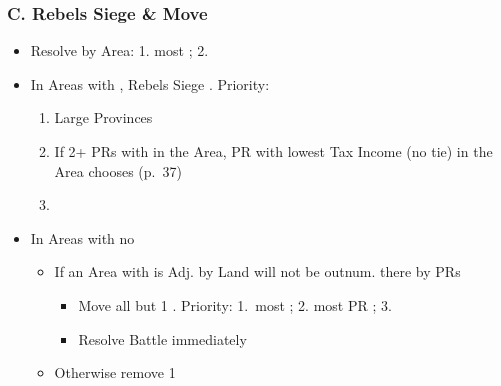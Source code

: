 \documentclass[10pt]{article}
\begin{document}
\subsubsection*{C. Rebels Siege \& Move}
\begin{itemize}
	\item Resolve by Area: 1. most \rebels; 2. \az
	\item In Areas with \unrest, Rebels Siege \unrest. Priority:
	\begin{enumerate}
		\item Large Provinces
		\item If 2+ PRs with \unrest in the Area, PR with lowest Tax Income (no tie) in the Area chooses (p.~37)
		\item \az
	\end{enumerate}
	\item In Areas with no \unrest
	\begin{itemize}
		\item If an Area with \unrest is Adj. by Land  \rebels will not be outnum. there by PRs
		\begin{itemize}
			\item Move all but 1 \rebel. Priority: 1. most \unrest; 2. most PR \towns; 3. \az
			\item Resolve Battle immediately
		\end{itemize}
		\item Otherwise remove 1\rebel
	\end{itemize}
\end{itemize}
\end{document}
